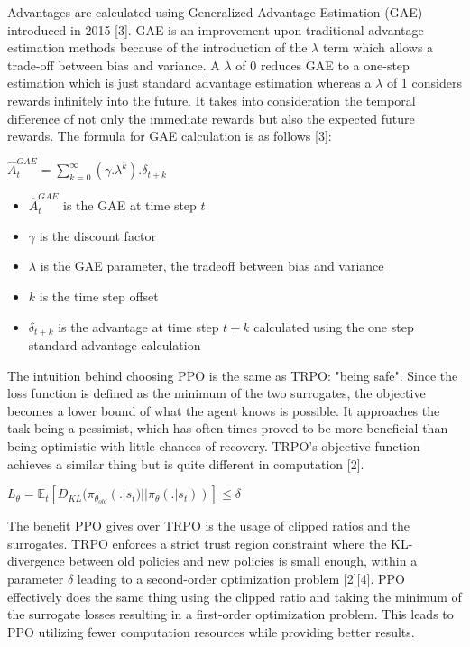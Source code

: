 \documentclass{article}
\begin{document}
Advantages are calculated using Generalized Advantage Estimation (GAE) introduced in 2015 [3]. GAE is an improvement upon traditional advantage estimation methods because of the introduction of the $\lambda$ term which allows a trade-off between bias and variance. A $\lambda$ of 0 reduces GAE to a one-step estimation which is just standard advantage estimation whereas a $\lambda$ of 1 considers rewards infinitely into the future. It takes into consideration the temporal difference of not only the immediate rewards but also the expected future rewards. The formula for GAE calculation is as follows [3]:

\begin{center}
	$\hat{A}^{GAE}_{t} = \sum_{k=0}^{\infty}(\gamma.\lambda^{k}).\delta_{t+k}$
\end{center}
\begin{itemize}
	\item $\hat{A}^{GAE}_{t}$ is the GAE at time step $t$
	\item $\gamma$ is the discount factor
	\item $\lambda$ is the GAE parameter, the tradeoff between bias and variance
	\item $k$ is the time step offset
	\item $\delta_{t+k}$ is the advantage at time step $t+k$ calculated using the one step standard advantage calculation
\end{itemize}

The intuition behind choosing PPO is the same as TRPO: "being safe". Since the loss function is defined as the minimum of the two surrogates, the objective becomes a lower bound of what the agent knows is possible. It approaches the task being a pessimist, which has often times proved to be more beneficial than being optimistic with little chances of recovery. TRPO's objective function achieves a similar thing but is quite different in computation [2].

\begin{center}
	$L_{\theta} = \mathbb{E}_{t}[D_{KL}(\pi_{\theta_{old}}(.|s_{t}) || \pi_{\theta}(.|s_{t}))] \leq \delta$
\end{center}

The benefit PPO gives over TRPO is the usage of clipped ratios and the surrogates. TRPO enforces a strict trust region constraint where the KL-divergence between old policies and new policies is small enough, within a parameter $\delta$ leading to a second-order optimization problem [2][4]. PPO effectively does the same thing using the clipped ratio and taking the minimum of the surrogate losses resulting in a first-order optimization problem. This leads to PPO utilizing fewer computation resources while providing better results.
\end{document}
